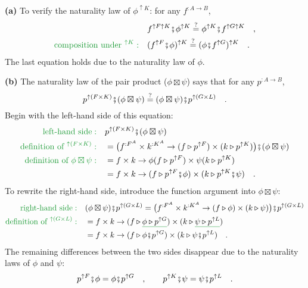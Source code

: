 \textbf{(a)} To verify the naturality law of $\phi^{\uparrow K}$:
for any $f^{:A\rightarrow B}$,
\begin{align*}
 & f^{\uparrow F\uparrow K}\bef\phi^{\uparrow K}\overset{?}{=}\phi^{\uparrow K}\bef f^{\uparrow G\uparrow K}\quad,\\
{\color{greenunder}\text{composition under }^{\uparrow K}:}\quad & (f^{\uparrow F}\bef\phi)^{\uparrow K}\overset{?}{=}(\phi\bef f^{\uparrow G})^{\uparrow K}\quad.
\end{align*}
The last equation holds due to the naturality law of $\phi$.

\textbf{(b)} The naturality law of the pair product ($\phi\boxtimes\psi$)
says that for any $p^{:A\rightarrow B}$,
\[
p^{\uparrow(F\times K)}\bef(\phi\boxtimes\psi)\overset{?}{=}(\phi\boxtimes\psi)\bef p^{\uparrow(G\times L)}\quad.
\]
Begin with the left-hand side of this equation:
\begin{align*}
{\color{greenunder}\text{left-hand side}:}\quad & p^{\uparrow(F\times K)}\bef(\phi\boxtimes\psi)\\
{\color{greenunder}\text{definition of }^{\uparrow(F\times K)}:}\quad & =\big(f^{:F^{A}}\times k^{:K^{A}}\rightarrow(f\triangleright p^{\uparrow F})\times(k\triangleright p^{\uparrow K})\big)\bef(\phi\boxtimes\psi)\\
{\color{greenunder}\text{definition of }\phi\boxtimes\psi:}\quad & =f\times k\rightarrow\phi(f\triangleright p^{\uparrow F})\times\psi(k\triangleright p^{\uparrow K})\\
 & =f\times k\rightarrow(f\triangleright p^{\uparrow F}\bef\phi)\times(k\triangleright p^{\uparrow K}\bef\psi)\quad.
\end{align*}
To rewrite the right-hand side, introduce the function argument into
$\phi\boxtimes\psi$:
\begin{align*}
{\color{greenunder}\text{right-hand side}:}\quad & (\phi\boxtimes\psi)\bef p^{\uparrow(G\times L)}=\big(f^{:F^{A}}\times k^{:K^{A}}\rightarrow(f\triangleright\phi)\times(k\triangleright\psi)\big)\bef p^{\uparrow(G\times L)}\\
{\color{greenunder}\text{definition of }^{\uparrow(G\times L)}:}\quad & =f\times k\rightarrow(f\triangleright\gunderline{\phi\triangleright p^{\uparrow G}})\times(k\triangleright\gunderline{\psi\triangleright p^{\uparrow L}})\\
 & =f\times k\rightarrow(f\triangleright\phi\bef p^{\uparrow G})\times(k\triangleright\psi\bef p^{\uparrow L})\quad.
\end{align*}
The remaining differences between the two sides disappear due to the
naturality laws of $\phi$ and $\psi$:
\[
p^{\uparrow F}\bef\phi=\phi\bef p^{\uparrow G}\quad,\quad\quad p^{\uparrow K}\bef\psi=\psi\bef p^{\uparrow L}\quad.
\]

